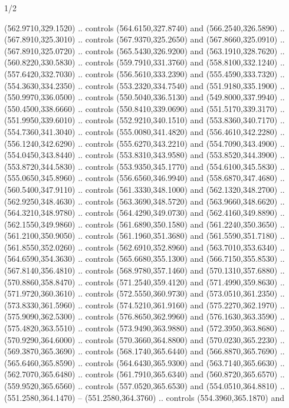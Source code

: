 \begin{flagdescription}{1/2}
\begin{scope}[xshift=0.5\flaglength,yshift=0.5\flagwidth,scale=\flagwidth/759]
\begin{scope}[y=0.8pt, x=0.8pt, yscale=-1,shift={(-720,-480)}]
\begin{scope}[cm={{1.14637,0.0,0.0,1.17117,(33.17849,82.1384)}}]
  (562.9710,329.1520) .. controls (564.6150,327.8740) and (566.2540,326.5890) ..
  (567.8910,325.3010) .. controls (567.9370,325.2650) and (567.8660,325.0910) ..
  (567.8910,325.0720) .. controls (565.5430,326.9200) and (563.1910,328.7620) ..
  (560.8220,330.5830) .. controls (559.7910,331.3760) and (558.8100,332.1240) ..
  (557.6420,332.7030) .. controls (556.5610,333.2390) and (555.4590,333.7320) ..
  (554.3630,334.2350) .. controls (553.2320,334.7540) and (551.9180,335.1900) ..
  (550.9970,336.0500) .. controls (550.5040,336.5130) and (549.8000,337.9940) ..
  (550.4500,338.6660) .. controls (550.8410,339.0690) and (551.5170,339.3170) ..
  (551.9950,339.6010) .. controls (552.9210,340.1510) and (553.8360,340.7170) ..
  (554.7360,341.3040) .. controls (555.0080,341.4820) and (556.4610,342.2280) ..
  (556.1240,342.6290) .. controls (555.6270,343.2210) and (554.7090,343.4900) ..
  (554.0450,343.8440) .. controls (553.8310,343.9580) and (553.8520,344.3900) ..
  (553.8720,344.5830) .. controls (553.9350,345.1770) and (554.6100,345.5830) ..
  (555.0650,345.8960) .. controls (556.6560,346.9940) and (558.6870,347.4680) ..
  (560.5400,347.9110) .. controls (561.3330,348.1000) and (562.1320,348.2700) ..
  (562.9250,348.4630) .. controls (563.3690,348.5720) and (563.9660,348.6620) ..
  (564.3210,348.9780) .. controls (564.4290,349.0730) and (562.4160,349.8890) ..
  (562.1550,349.9860) .. controls (561.6890,350.1580) and (561.2240,350.3650) ..
  (561.2100,350.9050) .. controls (561.1960,351.3680) and (561.5590,351.7180) ..
  (561.8550,352.0260) .. controls (562.6910,352.8960) and (563.7010,353.6340) ..
  (564.6590,354.3630) .. controls (565.6680,355.1300) and (566.7150,355.8530) ..
  (567.8140,356.4810) .. controls (568.9780,357.1460) and (570.1310,357.6880) ..
  (570.8860,358.8470) .. controls (571.2540,359.4120) and (571.4990,359.8630) ..
  (571.9720,360.3610) .. controls (572.5550,360.9730) and (573.0510,361.2350) ..
  (573.8330,361.5960) .. controls (574.5210,361.9160) and (575.2270,362.1970) ..
  (575.9090,362.5300) .. controls (576.8650,362.9960) and (576.1630,363.3590) ..
  (575.4820,363.5510) .. controls (573.9490,363.9880) and (572.3950,363.8680) ..
  (570.9290,364.6000) .. controls (570.3660,364.8800) and (570.0230,365.2230) ..
  (569.3870,365.3690) .. controls (568.1740,365.6440) and (566.8870,365.7690) ..
  (565.6460,365.8590) .. controls (564.6430,365.9300) and (563.7140,365.6630) ..
  (562.7070,365.6480) .. controls (561.7910,365.6340) and (560.8720,365.6570) ..
  (559.9520,365.6560) .. controls (557.0520,365.6530) and (554.0510,364.8810) ..
  (551.2580,364.1470) -- (551.2580,364.3760) .. controls (554.3960,365.1870) and

\end{scope}
\end{scope}
\end{scope}
\end{flagdescription}
